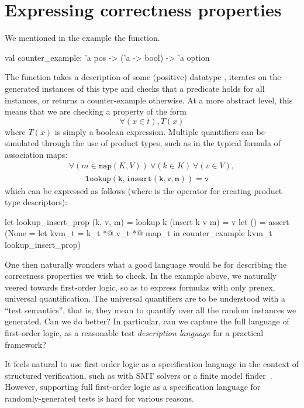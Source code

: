\section{Expressing correctness properties}
\label{sec:properties}

We mentioned in the  example the  function.
%
\begin{ocamlcode}
val counter_example: 'a pos -> ('a -> bool) -> 'a option
\end{ocamlcode}
%
The function takes a description of some (positive) datatype
, iterates on the generated instances of this type and checks
that a predicate  holds for all instances, or returns
a counter-example otherwise. At a more abstract level, this means that we are
checking a property of the form \[ \forall (x \in t), T(x) \] where
$T(x)$ is simply a boolean expression.
Multiple quantifiers can be simulated through the use of product types, such as
in the typical formula of association maps:
%
\[\begin{array}{l}
  \forall (m \in \mathtt{map}(K,V))\ \forall (k \in K)\ \forall (v \in V),\\
  \qquad \mathtt{lookup(k,insert(k,v,m)) = v}
\end{array}\]
%
which can be expressed as follows (where  is the operator for creating
product type descriptors):
%
\begin{ocamlcode}
  let lookup_insert_prop (k, v, m) =
    lookup k (insert k v m) = v
  let () = assert (None =
    let kvm_t = k_t *@ v_t *@ map_t in
    counter_example kvm_t lookup_insert_prop)
\end{ocamlcode}

One then naturally wonders what a good language would be for describing the
correctness properties we wish to check. In the example above, we naturally
veered towards first-order logic, so as to express formulas with only prenex,
universal quantification. The universal quantifiers are to be understood with a
``test semantics'', that is, they mean to quantify over all the random instances
we generated.
%
Can we do better? In particular, can we capture the full language of first-order
logic, as a reasonable test \emph{description language} for a practical
framework?

It feels natural to use first-order logic as a specification language
in the context of structured verification, such as with SMT solvers or
a finite model finder~\cite{DBLP:conf/itp/BlanchetteN10}.  However,
supporting full first-order logic as a specification language for
randomly-generated tests is hard for various reasons.

